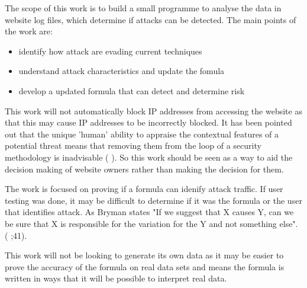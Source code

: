 The scope of this work is to build a small programme to analyse the data in website log files, which determine if attacks can be detected. The main points of the work are:
\begin{itemize}
    \item identify how attack are evading current techniques 
    \item understand attack characteristics and update the fomula
    \item develop a updated formula that can detect and determine risk
\end{itemize}

This work will not automatically block IP addresses from accessing the website as that this may cause IP addresses to be incorrectly blocked. It has been pointed out that the unique 'human' ability to appraise the contextual features of a potential threat means that removing them from the loop of a security methodology is inadvisable (\cite{TargetedCyberSecurity} ). So this work should be seen as a way to aid the decision making of website owners rather than making the decision for them. 


The work is focused on proving if a formula can idenify attack traffic. If user testing was done, it may be difficult to determine if it was the formula or the user that identifies attack. As Bryman states  "If we suggest that X causes Y, can we be sure that X is responsible for the variation for the Y and not something else". (\citeauthor{bryman_2016} \citeyear{bryman_2016};41).

This work will not be looking to generate its own data as it may be easier to prove the accuracy of the formula on real data sets and  means the formula is written in ways that it will be possible to interpret real data.